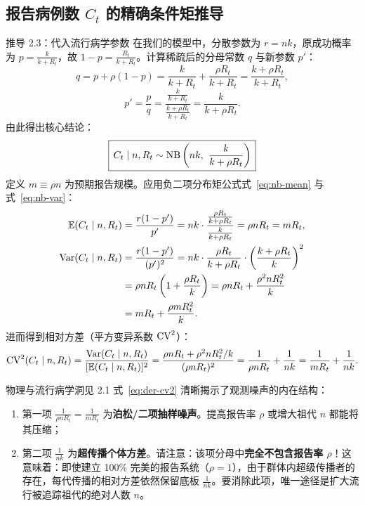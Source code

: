 \subsection{报告病例数 $C_t$ 的精确条件矩推导}

\begin{derivationbox}{推导 2.3：代入流行病学参数}
在我们的模型中，分散参数为 $r = nk$，原成功概率为 $p = \frac{k}{k + R_t}$，故 $1 - p = \frac{R_t}{k + R_t}$。计算稀疏后的分母常数 $q$ 与新参数 $p'$：
\begin{equation}
  q = p + \rho(1-p) = \frac{k}{k+R_t} + \frac{\rho R_t}{k+R_t} = \frac{k + \rho R_t}{k + R_t},
\end{equation}
\begin{equation}
  p' = \frac{p}{q} = \frac{\frac{k}{k+R_t}}{\frac{k+\rho R_t}{k+R_t}} = \frac{k}{k + \rho R_t}.
\end{equation}
由此得出核心结论：
\begin{equation}
  \boxed{\, C_t \mid n, R_t \sim \mathrm{NB}\left(nk,\ \frac{k}{k + \rho R_t}\right) \,}
  \label{eq:der-ct-dist}
\end{equation}
定义 $m \equiv \rho n$ 为预期报告规模。应用负二项分布矩公式式~\eqref{eq:nb-mean} 与式~\eqref{eq:nb-var}：
\begin{align}
  \mathbb{E}(C_t \mid n, R_t) &= \frac{r(1-p')}{p'} = nk \cdot \frac{\frac{\rho R_t}{k+\rho R_t}}{\frac{k}{k+\rho R_t}} = \rho n R_t = m R_t, \\
  \mathrm{Var}(C_t \mid n, R_t) &= \frac{r(1-p')}{(p')^2} = nk \cdot \frac{\rho R_t}{k+\rho R_t} \cdot \left(\frac{k+\rho R_t}{k}\right)^2 \nonumber \\
  &= \rho n R_t \left(1 + \frac{\rho R_t}{k}\right) = \rho n R_t + \frac{\rho^2 n R_t^2}{k} \nonumber \\
  &= m R_t + \frac{\rho m R_t^2}{k}.
\end{align}
进而得到相对方差（平方变异系数 $\mathrm{CV}^2$）：
\begin{equation}
  \mathrm{CV}^2(C_t \mid n, R_t) = \frac{\mathrm{Var}(C_t \mid n, R_t)}{[\mathbb{E}(C_t \mid n, R_t)]^2} = \frac{\rho n R_t + \rho^2 n R_t^2 / k}{(\rho n R_t)^2} = \frac{1}{\rho n R_t} + \frac{1}{nk} = \frac{1}{m R_t} + \frac{1}{nk}.
  \label{eq:der-cv2}
\end{equation}
\end{derivationbox}

\begin{insightbox}{物理与流行病学洞见 2.1}
式~\eqref{eq:der-cv2} 清晰揭示了观测噪声的内在结构：
\begin{enumerate}
  \item 第一项 $\frac{1}{\rho n R_t} = \frac{1}{m R_t}$ 为\textbf{泊松/二项抽样噪声}。提高报告率 $\rho$ 或增大祖代 $n$ 都能将其压缩；
  \item 第二项 $\frac{1}{nk}$ 为\textbf{超传播个体方差}。请注意：该项分母中\textbf{完全不包含报告率 $\rho$}！这意味着：即使建立 100\% 完美的报告系统（$\rho = 1$），由于群体内超级传播者的存在，每代传播的相对方差依然保留底板 $\frac{1}{nk}$。要消除此项，唯一途径是扩大流行被追踪祖代的绝对人数 $n$。
\end{enumerate}
\end{insightbox}
